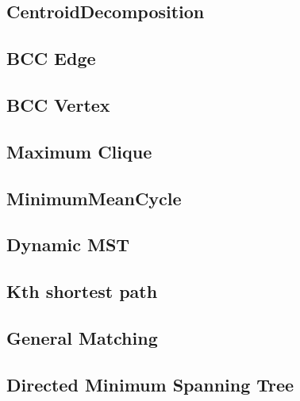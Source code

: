 \documentclass[a4paper,10pt,twocolumn,oneside]{article}
\begin{document}
\subsection{CentroidDecomposition}


\subsection{BCC Edge}


\subsection{BCC Vertex}


% 

\subsection{Maximum Clique}


\subsection{MinimumMeanCycle}


\subsection{Dynamic MST}


\subsection{Kth shortest path}


\subsection{General Matching}


\subsection{Directed Minimum Spanning Tree}

\end{document}
